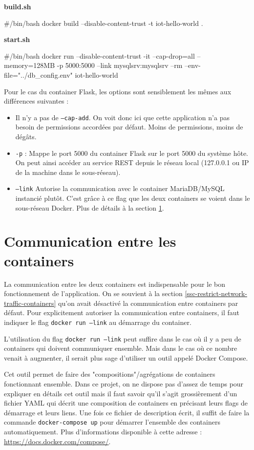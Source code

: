 \documentclass[11pt,a4paper,oneside]{report}
\newcommand{\code}[1]{\texttt{#1}}
\begin{document}
\textbf{build.sh}
\begin{bashcode}
#/bin/bash
docker build --disable-content-trust -t iot-hello-world .
\end{bashcode}

\textbf{start.sh}
\begin{bashcode}
#/bin/bash
docker run --disable-content-trust -it --cap-drop=all --memory=128MB -p 5000:5000 --link mysqlsrv:mysqlsrv --rm --env-file="../db_config.env" iot-hello-world
\end{bashcode}

Pour le cas du container Flask, les options sont sensiblement les mêmes aux différences suivantes :
\begin{itemize}
\item Il n'y a pas de \code{--cap-add}. On voit donc ici que cette application n'a pas besoin de permissions accordées par défaut. Moins de permissions, moins de dégâts.
\item \code{-p} : Mappe le port 5000 du container Flask sur le port 5000 du système hôte. On peut ainsi accéder au service REST depuis le réseau local (127.0.0.1 ou IP de la machine dans le sous-réseau).
\item \code{--link} Autorise la communication avec le container MariaDB/MySQL instancié plutôt. C'est grâce à ce flag que les deux containers se voient dans le sous-réseau Docker. Plus de détails à la section \ref{sc-communication-entre-containers}.
\end{itemize}

\section{Communication entre les containers}\label{sc-communication-entre-containers}
La communication entre les deux containers est indispensable pour le bon fonctionnement de l'application. On se souvient à la section \ref{ssc-restrict-network-traffic-containers} qu'on avait désactivé la communication entre containers par défaut. Pour explicitement autoriser la communication entre containers, il faut indiquer le flag \code{docker run --link} au démarrage du container.

L'utilisation du flag \code{docker run --link} peut suffire dans le cas où il y a peu de containers qui doivent communiquer ensemble. Mais dans le cas où ce nombre venait à augmenter, il serait plus sage d'utiliser un outil appelé Docker Compose.

Cet outil permet de faire des "compositions"/agrégations de containers fonctionnant ensemble. Dans ce projet, on ne dispose pas d'assez de temps pour expliquer en détails cet outil mais il faut savoir qu'il s'agit grossièrement d'un fichier YAML qui décrit une composition de containers en précisant leurs flags de démarrage et leurs liens. Une fois ce fichier de description écrit, il suffit de faire la commande \code{docker-compose up} pour démarrer l'ensemble des containers automatiquement. Plus d'informations disponible à cette adresse : \url{https://docs.docker.com/compose/}.
\end{document}

